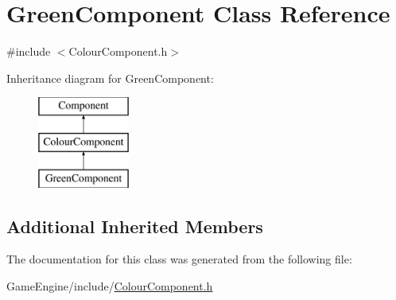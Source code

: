 \hypertarget{class_green_component}{}\section{Green\+Component Class Reference}
\label{class_green_component}


{\ttfamily \#include $<$Colour\+Component.\+h$>$}

Inheritance diagram for Green\+Component\+:\begin{figure}[H]
\begin{center}
\leavevmode
\includegraphics[height=3.000000cm]{class_green_component}
\end{center}
\end{figure}
\subsection*{Additional Inherited Members}


The documentation for this class was generated from the following file\+:\begin{DoxyCompactItemize}
\item 
Game\+Engine/include/\mbox{\hyperlink{_colour_component_8h}{Colour\+Component.\+h}}\end{DoxyCompactItemize}
